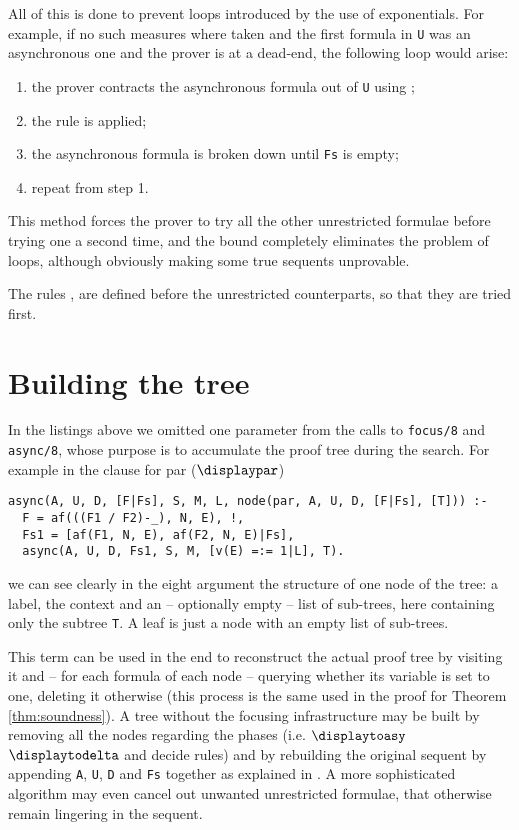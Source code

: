 All of this is done to prevent loops introduced by the use of exponentials.
For example, if no such measures where taken and the first formula in \texttt{U} was an asynchronous one and the prover is at a dead-end, the following loop would arise:
\begin{enumerate}
	\item the prover contracts the asynchronous formula out of \texttt{U} using \derRule{\displaydecide[2]};
	\item the rule \derRule{\displaytoasy} is applied;
	\item the asynchronous formula is broken down until \texttt{Fs} is empty;
	\item repeat from step 1.
\end{enumerate}
This method forces the prover to try all the other unrestricted formulae before trying one a second time, and the bound completely eliminates the problem of loops, although obviously making some true sequents unprovable.

The rules \derRule{\displaydecide[1]}, \derRule{\displayid[1]} are defined before the unrestricted counterparts, so that they are tried first.

\section{Building the tree}
In the listings above we omitted one parameter from the calls to \texttt{focus/8} and \texttt{async/8}, whose purpose is to accumulate the proof tree during the search.
For example in the clause for par ($\displaypar$)
\begin{verbatim}
async(A, U, D, [F|Fs], S, M, L, node(par, A, U, D, [F|Fs], [T])) :- 
  F = af(((F1 / F2)-_), N, E), !,
  Fs1 = [af(F1, N, E), af(F2, N, E)|Fs],
  async(A, U, D, Fs1, S, M, [v(E) =:= 1|L], T).
\end{verbatim}
we can see clearly in the eight argument the structure of one node of the tree: a label, the context and an -- optionally empty -- list of sub-trees, here containing only the subtree \texttt{T}.
A leaf is just a node with an empty list of sub-trees.

This term can be used in the end to reconstruct the actual proof tree by visiting it and -- for each formula of each node -- querying whether its variable is set to one, deleting it otherwise (this process is the same used in the proof for Theorem \ref{thm:soundness}).
A tree without the focusing infrastructure may be built by removing all the nodes regarding the phases (i.e. $\displaytoasy$ $\displaytodelta$ and decide rules) and by rebuilding the original sequent by appending \texttt{A}, \texttt{U}, \texttt{D} and \texttt{Fs} together as explained in \cite{Focusing}. 
A more sophisticated algorithm may even cancel out unwanted unrestricted formulae, that otherwise remain lingering in the sequent.

